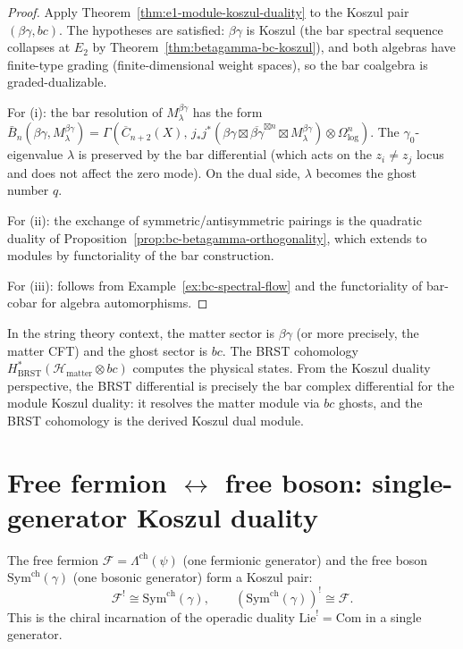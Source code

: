 \begin{proof}
Apply Theorem~\ref{thm:e1-module-koszul-duality} to the
Koszul pair $(\beta\gamma, bc)$.  The hypotheses are satisfied:
$\beta\gamma$ is Koszul (the bar spectral sequence collapses
at $E_2$ by Theorem~\ref{thm:betagamma-bc-koszul}), and
both algebras have finite-type grading (finite-dimensional
weight spaces), so the bar coalgebra is graded-dualizable.

For (i): the bar resolution of $M_\lambda^{\beta\gamma}$
has the form
$\bar{B}_n(\beta\gamma, M_\lambda^{\beta\gamma})
= \Gamma(\overline{C}_{n+2}(X),\,
j_*j^*(\beta\gamma \boxtimes
\overline{\beta\gamma}^{\boxtimes n} \boxtimes
M_\lambda^{\beta\gamma}) \otimes \Omega^n_{\log})$.
The $\gamma_0$-eigenvalue $\lambda$ is preserved by the
bar differential (which acts on the
$z_i \neq z_j$ locus and does not affect the zero mode).
On the dual side, $\lambda$ becomes the ghost number $q$.

For (ii): the exchange of symmetric/antisymmetric pairings
is the quadratic duality of Proposition~\ref{prop:bc-betagamma-orthogonality},
which extends to modules by functoriality of the bar construction.

For (iii): follows from Example~\ref{ex:bc-spectral-flow} and
the functoriality of bar-cobar for algebra automorphisms.
\end{proof}

\begin{remark}
\label{rem:brst-module-kd}
In the string theory context, the matter sector is
$\beta\gamma$ (or more precisely, the matter CFT) and the
ghost sector is $bc$.  The BRST cohomology
$H^*_{\mathrm{BRST}}(\mathcal{H}_{\mathrm{matter}} \otimes bc)$
computes the physical states.  From the Koszul duality
perspective, the BRST differential is precisely the bar complex
differential for the module Koszul duality: it resolves the
matter module via $bc$ ghosts, and the BRST cohomology is the
derived Koszul dual module.
\end{remark}

\section{\texorpdfstring{Free fermion $\leftrightarrow$ free boson: single-generator Koszul duality}{Free fermion--free boson: single-generator Koszul duality}}

\begin{theorem}\label{thm:single-fermion-boson-duality}
The free fermion $\mathcal{F} = \Lambda^{\mathrm{ch}}(\psi)$ (one fermionic generator) and the free boson $\mathrm{Sym}^{\mathrm{ch}}(\gamma)$ (one bosonic generator) form a Koszul pair:
\[\mathcal{F}^! \cong \mathrm{Sym}^{\mathrm{ch}}(\gamma), \qquad
  (\mathrm{Sym}^{\mathrm{ch}}(\gamma))^! \cong \mathcal{F}.\]
This is the chiral incarnation of the operadic duality $\mathrm{Lie}^! = \mathrm{Com}$
in a single generator.
\end{theorem}

